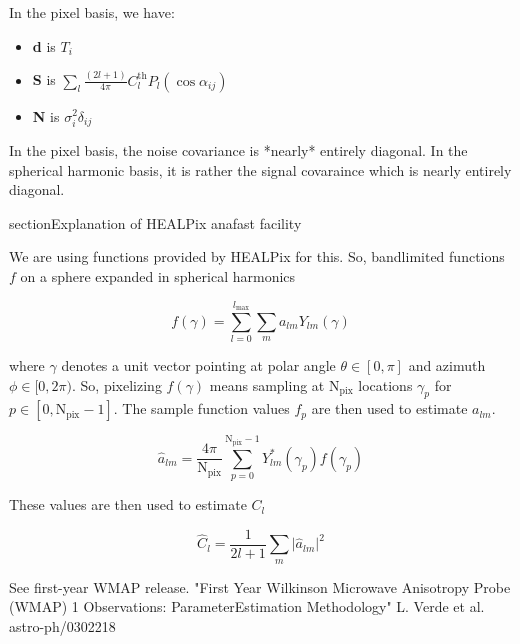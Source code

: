 \documentclass[a4paper, 11pt]{article}
\begin{document}
In the pixel basis, we have: 

\begin{itemize}
\item[]\textbf{d} is $T_i$
\item[]\textbf{S} is $\sum_{l}\frac{(2l+1)}{4\pi}C^{\text{th}}_l P_l (\cos\alpha_{ij})$
\item[]\textbf{N} is $\sigma^2_i\delta_{ij}$
\end{itemize}

In the pixel basis, the noise covariance is *nearly* entirely diagonal. In the spherical harmonic basis, it is rather the signal covaraince which is nearly entirely diagonal. \par

\*section{Explanation of HEALPix anafast facility}

We are using functions provided by HEALPix for this. So, bandlimited functions $f$ on a sphere expanded in spherical harmonics

\begin{equation}
f(\gamma)=\sum^{l_{\text{max}}}_{l=0}\sum_m a_{lm}Y_{lm}(\gamma)
\end{equation}

where $\gamma$ denotes a unit vector pointing at polar angle $\theta\in[0,\pi]$ and azimuth $\phi\in[0,2\pi)$. So, pixelizing $f(\gamma)$ means sampling at $\text{N}_\text{pix}$ locations $\gamma_p$ for $p\in[0,\text{N}_\text{pix}-1].$ The sample function values $f_p$ are then used to estimate $a_{lm}$. 


\begin{equation}
\hat{a}_{lm}=\frac{4\pi}{\text{N}_{\text{pix}}}\sum_{p=0}^{\text{N}_\text{pix}-1}Y^{*}_{lm}(\gamma_p)f(\gamma_p)
\end{equation}

These values are then used to estimate $C_l$

\begin{equation}
\hat{C}_l=\frac{1}{2l+1}\sum_m\vert\hat{a}_{lm}\vert^2
\end{equation}

\par


See first-year WMAP release. "First Year Wilkinson Microwave Anisotropy Probe (WMAP)
1 Observations: ParameterEstimation Methodology" L. Verde et al. 
astro-ph/0302218
\end{document}
